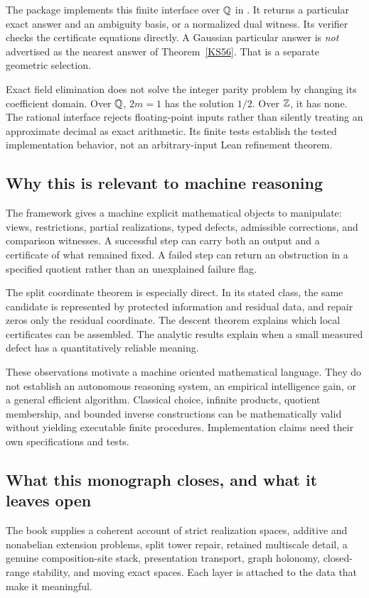 The package implements this finite interface over \(\mathbb Q\) in . It returns a particular exact answer and an ambiguity basis, or a normalized dual witness. Its verifier checks the certificate equations directly. A Gaussian particular answer is \emph{not} advertised as the nearest answer of Theorem~\ref{KS56}. That is a separate geometric selection.

Exact field elimination does not solve the integer parity problem by changing its coefficient domain. Over \(\mathbb Q\), \(2m=1\) has the solution \(1/2\). Over \(\mathbb Z\), it has none. The rational interface rejects floating-point inputs rather than silently treating an approximate decimal as exact arithmetic. Its finite tests establish the tested implementation behavior, not an arbitrary-input Lean refinement theorem.

\subsection{Why this is relevant to machine reasoning}
The framework gives a machine explicit mathematical objects to manipulate: views, restrictions, partial realizations, typed defects, admissible corrections, and comparison witnesses. A successful step can carry both an output and a certificate of what remained fixed. A failed step can return an obstruction in a specified quotient rather than an unexplained failure flag.

The split coordinate theorem is especially direct. In its stated class, the same candidate is represented by protected information and residual data, and repair zeros only the residual coordinate. The descent theorem explains which local certificates can be assembled. The analytic results explain when a small measured defect has a quantitatively reliable meaning.

These observations motivate a machine oriented mathematical language. They do not establish an autonomous reasoning system, an empirical intelligence gain, or a general efficient algorithm. Classical choice, infinite products, quotient membership, and bounded inverse constructions can be mathematically valid without yielding executable finite procedures. Implementation claims need their own specifications and tests.

\subsection{What this monograph closes, and what it leaves open}
The book supplies a coherent account of strict realization spaces, additive and nonabelian extension problems, split tower repair, retained multiscale detail, a genuine composition-site stack, presentation transport, graph holonomy, closed-range stability, and moving exact spaces. Each layer is attached to the data that make it meaningful.

